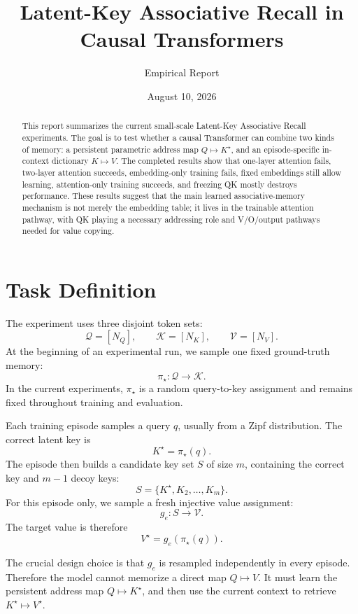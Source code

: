 \documentclass[11pt]{article}
\title{Latent-Key Associative Recall in Causal Transformers}
\author{Empirical Report}
\date{August 10, 2026}
\begin{document}
\maketitle

\begin{abstract}
This report summarizes the current small-scale Latent-Key Associative Recall experiments.
The goal is to test whether a causal Transformer can combine two kinds of memory:
a persistent parametric address map \(Q \mapsto K^\star\), and an episode-specific in-context dictionary \(K \mapsto V\).
The completed results show that one-layer attention fails, two-layer attention succeeds, embedding-only training fails, fixed embeddings still allow learning, attention-only training succeeds, and freezing QK mostly destroys performance. These results suggest that the main learned associative-memory mechanism is not merely the embedding table; it lives in the trainable attention pathway, with QK playing a necessary addressing role and V/O/output pathways needed for value copying.
\end{abstract}

\section{Task Definition}

The experiment uses three disjoint token sets:
\[
\mathcal Q = [N_Q], \qquad
\mathcal K = [N_K], \qquad
\mathcal V = [N_V].
\]
At the beginning of an experimental run, we sample one fixed ground-truth memory:
\[
\pi_\star: \mathcal Q \to \mathcal K.
\]
In the current experiments, \(\pi_\star\) is a random query-to-key assignment and remains fixed throughout training and evaluation.

Each training episode samples a query \(q\), usually from a Zipf distribution.
The correct latent key is
\[
K^\star = \pi_\star(q).
\]
The episode then builds a candidate key set \(S\) of size \(m\), containing the correct key and \(m-1\) decoy keys:
\[
S = \{K^\star, K_2, \ldots, K_m\}.
\]
For this episode only, we sample a fresh injective value assignment:
\[
g_e: S \to \mathcal V.
\]
The target value is therefore
\[
V^\star = g_e(\pi_\star(q)).
\]

The crucial design choice is that \(g_e\) is resampled independently in every episode.
Therefore the model cannot memorize a direct map \(Q \mapsto V\).
It must learn the persistent address map \(Q \mapsto K^\star\), and then use the current context to retrieve \(K^\star \mapsto V^\star\).
\end{document}
